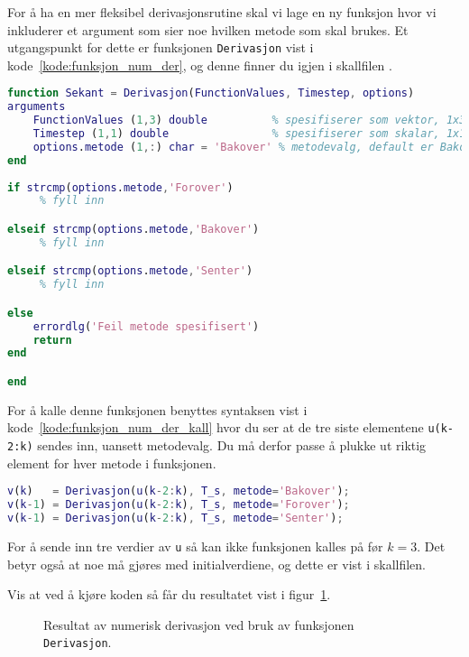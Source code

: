 For å ha en mer fleksibel derivasjonsrutine skal vi lage en ny
funksjon hvor vi inkluderer et argument som sier noe hvilken
metode som skal brukes.
Et utgangspunkt for dette er funksjonen
{\tt  Derivasjon} vist i kode~\ref{kode:funksjon_num_der}, og denne
finner du igjen i skallfilen .

\begin{lstlisting}[caption={Utvidet funksjon for numerisk derivasjon.},
language= Matlab, 
numbers=none,  label=kode:funksjon_num_der]
function Sekant = Derivasjon(FunctionValues, Timestep, options)
arguments
    FunctionValues (1,3) double          % spesifiserer som vektor, 1x3
    Timestep (1,1) double                % spesifiserer som skalar, 1x1
    options.metode (1,:) char = 'Bakover' % metodevalg, default er Bakover
end
    
if strcmp(options.metode,'Forover')
     % fyll inn

elseif strcmp(options.metode,'Bakover')
     % fyll inn

elseif strcmp(options.metode,'Senter')
     % fyll inn

else
    errordlg('Feil metode spesifisert')
    return
end

end
\end{lstlisting}

For å kalle denne funksjonen benyttes syntaksen vist i
kode~\ref{kode:funksjon_num_der_kall} hvor du
ser at de tre siste elementene {\tt  u(k-2:k)}
sendes inn, uansett  metodevalg. Du må derfor passe å plukke ut riktig
element for hver metode i funksjonen.



\begin{lstlisting}[caption={Alternativ bruk av funksjonen {\tt Derivasjon}.},
language= Matlab,  label=kode:funksjon_num_der_kall, numbers=none]
v(k)   = Derivasjon(u(k-2:k), T_s, metode='Bakover');
v(k-1) = Derivasjon(u(k-2:k), T_s, metode='Forover');
v(k-1) = Derivasjon(u(k-2:k), T_s, metode='Senter');
\end{lstlisting}

For å sende inn tre verdier av {\tt u} så kan ikke funksjonen
kalles på før $k{=}3$. Det betyr også at noe må gjøres med
initialverdiene, og dette er vist i skallfilen.

Vis at ved å kjøre koden så får du resultatet vist i figur~\ref{fig:3e_o}. 

    \begin{figure}[H]
      \centering
      \hspace*{0mm}
      \caption{Resultat av numerisk derivasjon ved bruk av funksjonen
        {\tt Derivasjon}. }
      \label{fig:3e_o}
    \end{figure}
